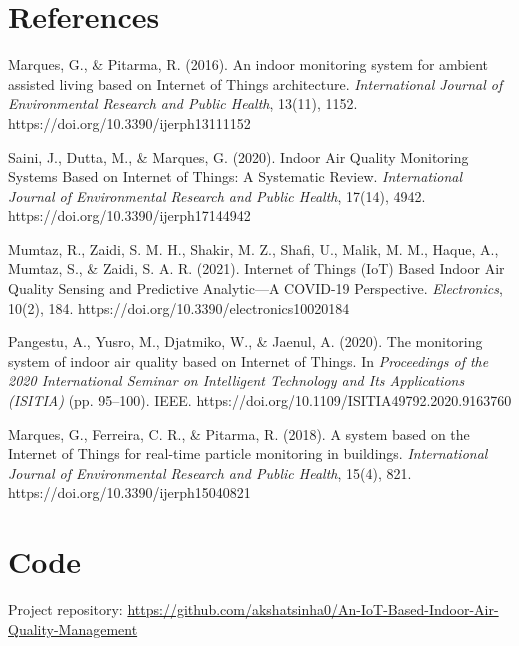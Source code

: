 \documentclass[12pt]{report}
\begin{document}
\section{References}
\begin{thebibliography}{9}
Marques, G., \& Pitarma, R. (2016). An indoor monitoring system for ambient assisted living based on Internet of Things architecture. \emph{International Journal of Environmental Research and Public Health}, 13(11), 1152. https://doi.org/10.3390/ijerph13111152

Saini, J., Dutta, M., \& Marques, G. (2020). Indoor Air Quality Monitoring Systems Based on Internet of Things: A Systematic Review. \emph{International Journal of Environmental Research and Public Health}, 17(14), 4942. https://doi.org/10.3390/ijerph17144942

Mumtaz, R., Zaidi, S. M. H., Shakir, M. Z., Shafi, U., Malik, M. M., Haque, A., Mumtaz, S., \& Zaidi, S. A. R. (2021). Internet of Things (IoT) Based Indoor Air Quality Sensing and Predictive Analytic—A COVID-19 Perspective. \emph{Electronics}, 10(2), 184. https://doi.org/10.3390/electronics10020184

Pangestu, A., Yusro, M., Djatmiko, W., \& Jaenul, A. (2020). The monitoring system of indoor air quality based on Internet of Things. In \emph{Proceedings of the 2020 International Seminar on Intelligent Technology and Its Applications (ISITIA)} (pp. 95--100). IEEE. https://doi.org/10.1109/ISITIA49792.2020.9163760

Marques, G., Ferreira, C. R., \& Pitarma, R. (2018). A system based on the Internet of Things for real-time particle monitoring in buildings. \emph{International Journal of Environmental Research and Public Health}, 15(4), 821. https://doi.org/10.3390/ijerph15040821
\end{thebibliography}

\section{Code}
Project repository: \url{https://github.com/akshatsinha0/An-IoT-Based-Indoor-Air-Quality-Management}
\end{document}
